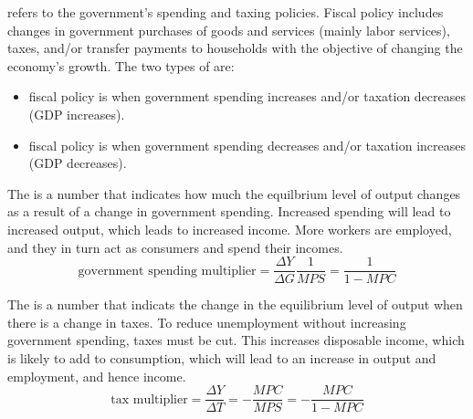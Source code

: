 \documentclass{article}
\begin{document}
\begin{definition}
  refers to the government's spending and taxing policies. Fiscal policy includes changes in government purchases of goods and services (mainly labor services), taxes, and/or transfer payments to households with the objective of changing the economy's growth. The two types of  are: 
  \begin{itemize}
    \item {} fiscal policy is when government spending increases and/or taxation decreases (GDP increases). 
    \item {} fiscal policy is when government spending decreases and/or taxation increases (GDP decreases). 
  \end{itemize}
\end{definition}

The  is a number that indicates how much the equilbrium level of output changes as a result of a change in government spending. Increased spending will lead to increased output, which leads to increased income. More workers are employed, and they in turn act as consumers and spend their incomes. $$\textrm{government spending multiplier} = \frac{\Delta Y}{\Delta G} \frac{1}{MPS} = \frac{1}{1-MPC}$$

The  is a number that indicats the change in the equilibrium level of output when there is a change in taxes. To reduce unemployment without increasing government spending, taxes must be cut. This increases disposable income, which is likely to add to consumption, which will lead to an increase in output and employment, and hence income. $$\textrm{tax multiplier} = \frac{\Delta Y}{\Delta T} = - \frac{MPC}{MPS} = - \frac{MPC}{1-MPC}$$
\end{document}
